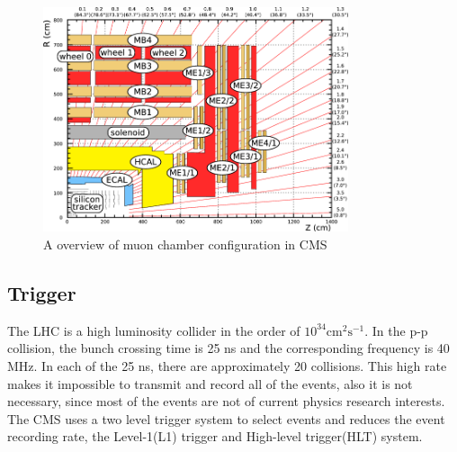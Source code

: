 \begin{figure}[htbp] 
\centering
\includegraphics[width=0.8\textwidth]{chapter3/Muon_chambers.png}
\caption{A overview of muon chamber configuration in CMS~\cite{Muon_chambers}}
\label{fig:muon_sketch}
\end{figure}


\subsection{Trigger}

The LHC is a high luminosity collider in the order of $10^{34}\textrm{cm}^{2}\textrm{s}^{-1}$. In the p-p collision, the bunch crossing time is 25 ns and the corresponding frequency is 40 MHz. In each of the 25 ns, there are approximately 20 collisions. This high rate makes it impossible to transmit and record all of the events, also it is not necessary, since most of the events are not of current physics research interests. The CMS uses a two level trigger system to select events and reduces the event recording rate, the Level-1(L1) trigger and High-level trigger(HLT) system. 


